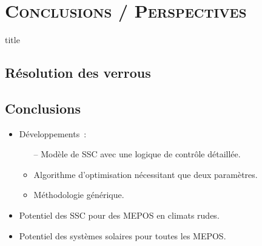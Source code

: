 \documentclass[xcolor=x11names, compress, 11pt]{beamer}
\begin{document}
\section{\scshape Conclusions / Perspectives}
\begin{frame}[plain]
    \vfill
    \centering
    \begin{beamercolorbox}[sep=8pt,center,shadow=true,rounded=true]{title}
    \insertsectionhead\par%
    \end{beamercolorbox}
    \vfill
\end{frame}


\subsection{Résolution des verrous}
\begin{frame}[c]
    \vfill
    \vfill
\end{frame}


\subsection{Conclusions}
\begin{frame}[c]
    \vfill
    \begin{itemize}
        \item Développements~:
        \begin{itemize}
            \footnotesize
            \item[--] Modèle de SSC avec une logique de contrôle détaillée.
            \item<2->[--] Algorithme d’optimisation nécessitant que deux paramètres.
            \item<3->[--] Méthodologie générique.
        \end{itemize}
        \vfill
        \vfill
        \item<6-> Potentiel des SSC pour des MEPOS en climats rudes.
        \item<7-> Potentiel des systèmes solaires pour toutes les MEPOS.
    \end{itemize}
    \vfill
\end{frame}
\end{document}
